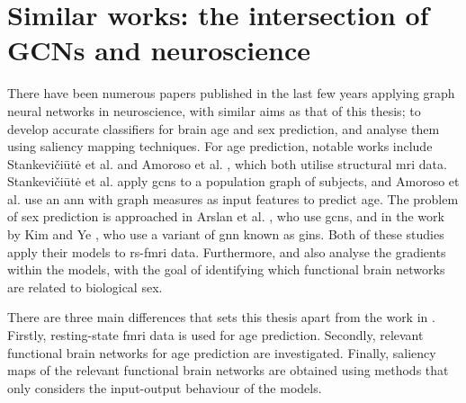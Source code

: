 \section{Similar works: the intersection of GCNs and neuroscience}


There have been numerous papers published in the last few years applying graph neural networks in neuroscience, with similar aims as that of this thesis; to develop accurate classifiers for brain age and sex prediction, and analyse them using saliency mapping techniques. For age prediction, notable works include Stankevičiūtė et al. \cite{stankeviciute} and Amoroso et al. \cite{amoroso_multiplex_age}, which both utilise structural \acrshort{mri} data. Stankevičiūtė et al. apply \acrshort{gcn}s to a population graph of subjects, and Amoroso et al. use an \acrshort{ann} with graph measures as input features to predict age. The problem of sex prediction is approached in Arslan et al. \cite{arslan}, who use \acrshort{gcn}s, and in the work by Kim and Ye \cite{understanding_gnn}, who use a variant of \acrshort{gnn} known as \acrshort{gin}s. Both of these studies apply their models to \acrshort{rs-fmri} data. Furthermore, \cite{arslan} and \cite{understanding_gnn} also analyse the gradients within the models, with the goal of identifying which functional brain networks are related to biological sex. 

There are three main differences that sets this thesis apart from the work in \cite{stankeviciute, amoroso_multiplex_age, arslan, understanding_gnn}. Firstly, resting-state \acrshort{fmri} data is used for age prediction. Secondly, relevant functional brain networks for age prediction are investigated. Finally, saliency maps of the relevant functional brain networks are obtained using methods that only considers the input-output behaviour of the models. 

